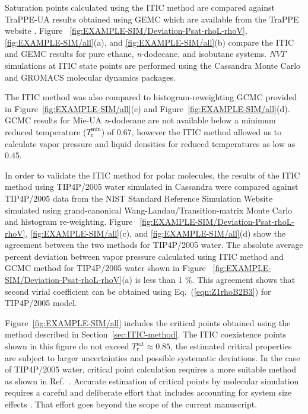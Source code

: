 \documentclass[5p,times]{elsarticle}
\begin{document}
Saturation points calculated using the ITIC method are compared against TraPPE-UA results obtained using GEMC which are available from the TraPPE website \cite{eggimann2014}. Figure~ \ref{fig:EXAMPLE-SIM/Deviation-Psat-rhoL-rhoV}, \ref{fig:EXAMPLE-SIM/all}(a), and \ref{fig:EXAMPLE-SIM/all}(b) compare the ITIC and GEMC results for pure ethane, \textit{n}-dodecane, and isobutane systems. $NVT$ simulations at ITIC state points are performed using the Cassandra Monte Carlo \cite{Shah2017} and GROMACS molecular dynamics \cite{Lindahl2001} packages. 

The ITIC method was also compared to histogram-reweighting GCMC provided in Figure~\ref{fig:EXAMPLE-SIM/all}(c) and Figure~\ref{fig:EXAMPLE-SIM/all}(d). GCMC results for Mie-UA \textit{n}-dodecane are not available below a minimum reduced temperature ($T_\mathrm{r}^{\mathrm{min}}$) of 0.67, however the ITIC method allowed us to calculate vapor pressure and liquid densities for reduced temperatures as low as 0.45. 

In order to validate the ITIC method for polar molecules, the results of the ITIC method using TIP4P/2005 water simulated in Cassandra were compared against TIP4P/2005 data from the NIST Standard Reference Simulation Website \cite{Shen2008} simulated using grand-canonical Wang-Landau/Transition-matrix Monte Carlo and histogram re-weighting. Figure~ \ref{fig:EXAMPLE-SIM/Deviation-Psat-rhoL-rhoV}, \ref{fig:EXAMPLE-SIM/all}(c), and \ref{fig:EXAMPLE-SIM/all}(d) show the agreement between the two methods for TIP4P/2005 water. The absolute average percent deviation between vapor pressure calculated using ITIC method and GCMC method for TIP4P/2005 water shown in Figure~ \ref{fig:EXAMPLE-SIM/Deviation-Psat-rhoL-rhoV}(a) is less than 1 \%. This agreement shows that second virial coefficient can be obtained using Eq.~(\ref{eqn:Z1rhoB2B3}) for TIP4P/2005 model.

Figure~\ref{fig:EXAMPLE-SIM/all} includes the critical points obtained using the method described in Section~\ref{sec:ITIC-method}. The ITIC coexistence points 
shown in this figure do not exceed $T_\mathrm{r}^\mathrm{sat} \approx 0.85$, the estimated critical properties are subject to larger uncertainties and possible systematic deviations. In the case of TIP4P/2005 water, critical point calculation requires a more suitable method as shown in Ref.~\cite{Vega2006}. Accurate estimation of critical points by molecular simulation requires a careful and deliberate effort that includes accounting for system size effects \cite{orkoulas2001precise}. That effort goes beyond the scope of the current manuscript.
\end{document}
